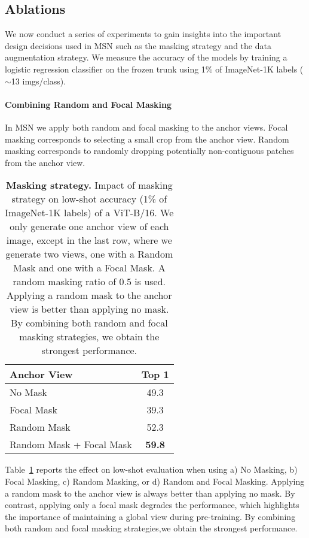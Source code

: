 \documentclass{article}
\begin{document}
\subsection{Ablations}
We now conduct a series of experiments to gain insights into the important design decisions used in MSN such as the masking strategy and the data augmentation strategy.
We measure the accuracy of the models by training a logistic regression classifier on the frozen trunk using 1\% of ImageNet-1K labels ($\sim$13 imgs/class).

\paragraph{Combining Random and Focal Masking}
In MSN we apply both random and focal masking to the anchor views.
Focal masking corresponds to selecting a small crop from the anchor view.
Random masking corresponds to randomly dropping potentially non-contiguous patches from the anchor view.
\begin{table}[h]
    \centering
    \caption{{\bf Masking strategy.} Impact of masking strategy on low-shot accuracy (1\% of ImageNet-1K labels) of a ViT-B/16. We only generate one anchor view of each image, except in the last row, where we generate two views, one with a Random Mask and one with a Focal Mask. A random masking ratio of $0.5$ is used. Applying  a  random  mask  to  the  anchor  view  is  better than applying no mask. By combining both random and focal masking strategies, we obtain the strongest performance.}
    \label{tb:mask_strategies}
    \begin{tabular}{lc}
      {\bf\small Anchor View} & {\bf\small Top 1} \\\toprule 
      No Mask &  49.3 \\ \midrule
      Focal Mask & 39.3  \\
      Random Mask & 52.3 \\
      Random Mask + Focal Mask & \cellcolor{fbApp}\bf 59.8 \\
      \bottomrule
    \end{tabular}
\end{table}

Table~\ref{tb:mask_strategies} reports the effect on low-shot evaluation when using a) No Masking, b) Focal Masking, c) Random Masking, or d)  Random and Focal Masking.
Applying a random mask to the anchor view is always better than applying no mask.
By contrast, applying only a focal mask degrades the performance, which highlights the importance of maintaining a global view during pre-training.
By combining both random and focal masking strategies,we obtain the strongest performance.
\end{document}
